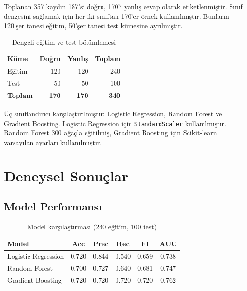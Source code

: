 \documentclass[conference]{IEEEtran}
\begin{document}
Toplanan 357 kaydın 187'si doğru, 170'i yanlış cevap olarak etiketlenmiştir.
Sınıf dengesini sağlamak için her iki sınıftan 170'er örnek kullanılmıştır.
Bunların 120'şer tanesi eğitim, 50'şer tanesi test kümesine ayrılmıştır.

\begin{table}[H]
  \centering
  \caption{Dengeli eğitim ve test bölümlemesi}
  \label{tab:split}
  \begin{tabular}{lrrr}
    \toprule
    \textbf{Küme} & \textbf{Doğru} & \textbf{Yanlış} & \textbf{Toplam} \\
    \midrule
    Eğitim & 120 & 120 & 240 \\
    Test & 50 & 50 & 100 \\
    \textbf{Toplam} & \textbf{170} & \textbf{170} & \textbf{340} \\
    \bottomrule
  \end{tabular}
\end{table}

Üç sınıflandırıcı karşılaştırılmıştır: Logistic Regression, Random Forest ve
Gradient Boosting. Logistic Regression için \texttt{StandardScaler}
kullanılmıştır. Random Forest 300 ağaçla eğitilmiş, Gradient Boosting için
Scikit-learn varsayılan ayarları kullanılmıştır.

\section{Deneysel Sonuçlar}

\subsection{Model Performansı}

\begin{table}[H]
  \centering
  \caption{Model karşılaştırması (240 eğitim, 100 test)}
  \label{tab:results}
  \begin{tabular}{lccccc}
    \toprule
    \textbf{Model} & \textbf{Acc} & \textbf{Prec} & \textbf{Rec} & \textbf{F1} & \textbf{AUC} \\
    \midrule
    Logistic Regression & 0.720 & 0.844 & 0.540 & 0.659 & 0.738 \\
    Random Forest       & 0.700 & 0.727 & 0.640 & 0.681 & 0.747 \\
    Gradient Boosting   & 0.720 & 0.720 & 0.720 & 0.720 & 0.762 \\
    \bottomrule
  \end{tabular}
\end{table}
\end{document}
